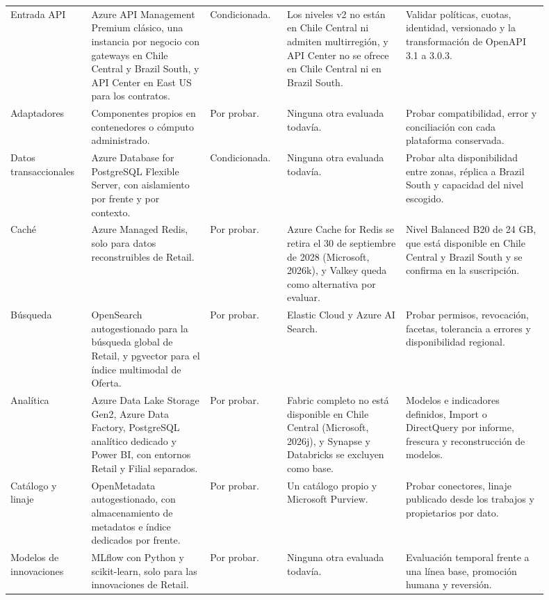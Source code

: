 \documentclass[11pt]{article}
\begin{document}
\begin{longtable}{@{}p{0.135\linewidth}p{0.2\linewidth}p{0.12\linewidth}p{0.2\linewidth}p{0.245\linewidth}@{}}
Entrada API & Azure API Management Premium clásico, una instancia por negocio con gateways en Chile Central y Brazil South, y API Center en East US para los contratos. & Condicionada. & Los niveles v2 no están en Chile Central ni admiten multirregión, y API Center no se ofrece en Chile Central ni en Brazil South. & Validar políticas, cuotas, identidad, versionado y la transformación de OpenAPI 3.1 a 3.0.3. \\
Adaptadores & Componentes propios en contenedores o cómputo administrado. & Por probar. & Ninguna otra evaluada todavía. & Probar compatibilidad, error y conciliación con cada plataforma conservada. \\
Datos transaccionales & Azure Database for PostgreSQL Flexible Server, con aislamiento por frente y por contexto. & Condicionada. & Ninguna otra evaluada todavía. & Probar alta disponibilidad entre zonas, réplica a Brazil South y capacidad del nivel escogido. \\
Caché & Azure Managed Redis, solo para datos reconstruibles de Retail. & Por probar. & Azure Cache for Redis se retira el 30 de septiembre de 2028 (Microsoft, 2026k), y Valkey queda como alternativa por evaluar. & Nivel Balanced B20 de 24 GB, que está disponible en Chile Central y Brazil South y se confirma en la suscripción. \\
Búsqueda & OpenSearch autogestionado para la búsqueda global de Retail, y pgvector para el índice multimodal de Oferta. & Por probar. & Elastic Cloud y Azure AI Search. & Probar permisos, revocación, facetas, tolerancia a errores y disponibilidad regional. \\
Analítica & Azure Data Lake Storage Gen2, Azure Data Factory, PostgreSQL analítico dedicado y Power BI, con entornos Retail y Filial separados. & Por probar. & Fabric completo no está disponible en Chile Central (Microsoft, 2026j), y Synapse y Databricks se excluyen como base. & Modelos e indicadores definidos, Import o DirectQuery por informe, frescura y reconstrucción de modelos. \\
Catálogo y linaje & OpenMetadata autogestionado, con almacenamiento de metadatos e índice dedicados por frente. & Por probar. & Un catálogo propio y Microsoft Purview. & Probar conectores, linaje publicado desde los trabajos y propietarios por dato. \\
Modelos de innovaciones & MLflow con Python y scikit-learn, solo para las innovaciones de Retail. & Por probar. & Ninguna otra evaluada todavía. & Evaluación temporal frente a una línea base, promoción humana y reversión. \\

\end{longtable}
\end{document}
